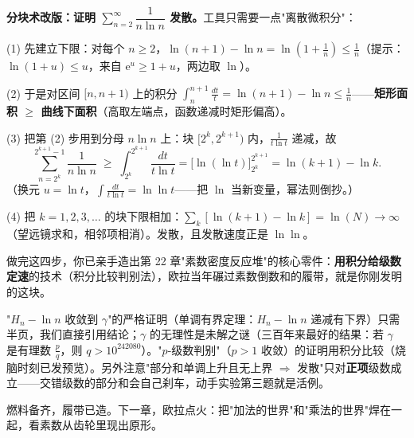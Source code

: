 \begin{shaonao}
\textbf{分块术改版：证明 $\sum_{n=2}^{\infty}\dfrac{1}{n\ln n}$ 发散。}工具只需要一点"离散微积分"：

(1) 先建立下限：对每个 $n \ge 2$，$\ln(n+1) - \ln n = \ln\left(1+\tfrac1n\right) \le \tfrac1n$（提示：$\ln(1+u) \le u$，来自 $\mathrm{e}^u \ge 1+u$，两边取 $\ln$）。

(2) 于是对区间 $[n, n+1)$ 上的积分 $\displaystyle\int_n^{n+1}\frac{dt}{t} = \ln(n+1)-\ln n \le \frac1n$——\textbf{矩形面积 $\ge$ 曲线下面积}（高取左端点，函数递减时矩形偏高）。

(3) 把第 (2) 步用到分母 $n\ln n$ 上：块 $[2^k, 2^{k+1})$ 内，$\tfrac{1}{t\ln t}$ 递减，故
\[
\sum_{n=2^k}^{2^{k+1}-1}\frac{1}{n\ln n} \;\ge\; \int_{2^k}^{2^{k+1}}\frac{dt}{t\ln t} = \Big[\ln(\ln t)\Big]_{2^k}^{2^{k+1}} = \ln(k+1) - \ln k .
\]
（换元 $u = \ln t$，$\int \tfrac{dt}{t\ln t} = \ln\ln t$——把 $\ln$ 当新变量，幂法则倒抄。）

(4) 把 $k = 1, 2, 3, \dots$ 的块下限相加：$\sum_k [\ln(k+1)-\ln k] = \ln(N) \to \infty$（望远镜求和，相邻项相消）。发散，且发散速度正是 $\ln\ln$。

做完这四步，你已亲手造出第 22 章"素数密度反应堆"的核心零件：\textbf{用积分给级数定速}的技术（积分比较判别法），欧拉当年碾过素数倒数和的履带，就是你刚发明的这块。
\end{shaonao}

\begin{chengshi}
"$H_n - \ln n$ 收敛到 $\gamma$"的严格证明（单调有界定理：$H_n - \ln n$ 递减有下界）只需半页，我们直接引用结论；$\gamma$ 的无理性是未解之谜（三百年来最好的结果：若 $\gamma$ 是有理数 $\tfrac pq$，则 $q > 10^{242080}$）。"$p$-级数判别"（$p > 1$ 收敛）的证明用积分比较（烧脑时刻已发预览）。另外注意"部分和单调上升且无上界 $\Rightarrow$ 发散"只对\textbf{正项}级数成立——交错级数的部分和会自己刹车，动手实验第三题就是活例。
\end{chengshi}

燃料备齐，履带已造。下一章，欧拉点火：把"加法的世界"和"乘法的世界"焊在一起，看素数从齿轮里现出原形。
